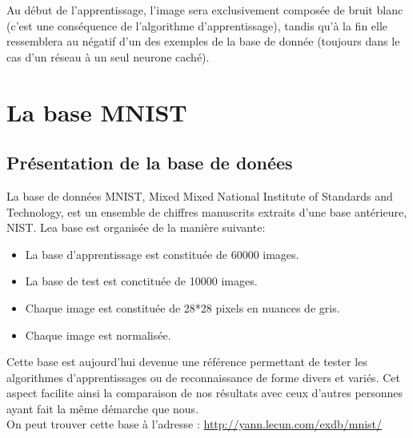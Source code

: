 \documentclass[a4paper,oneside]{report}
\begin{document}
                Au début de l'apprentissage, l'image sera exclusivement composée de bruit blanc (c'est 
une conséquence de l'algorithme d'apprentissage), tandis qu'à la fin elle ressemblera 
au négatif d'un des 
exemples de la base de donnée (toujours dans le cas d'un réseau à un seul neurone caché).


    \appendix

        \chapter{La base MNIST}

            \section{Présentation de la base de donées}

                La base de données MNIST, Mixed Mixed National Institute of Standards and Technology, 
est un ensemble de chiffres manuscrits extraits d'une base antérieure, NIST. Lea base 
est organisée de la manière 
suivante:

                \begin{itemize}
                    \item La base d'apprentissage est constituée de 60000 images.
                    \item La base de test est conctituée de 10000 images.
                    \item Chaque image est constituée de 28*28 pixels en nuances de gris.
                    \item Chaque image est normalisée.\\
                \end{itemize}

                Cette base est aujourd'hui devenue une référence permettant de tester les algorithmes 
d'apprentissages ou de reconnaissance de forme divers et variés. Cet aspect facilite 
ainsi la comparaison de nos 
résultats avec ceux d'autres personnes ayant fait la même démarche que nous.\\

                On peut trouver cette base à l'adresse : \url{http://yann.lecun.com/exdb/mnist/}
\end{document}
